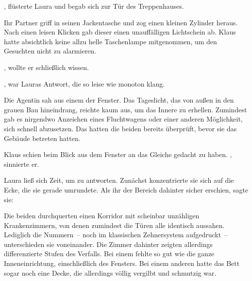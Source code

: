 \par

, flüsterte Laura und begab sich zur Tür des Treppenhauses.

\par

Ihr Partner griff in seinen Jackentasche und zog einen kleinen Zylinder heraus. Nach einen leisen Klicken gab dieser einen unauffälligen Lichtschein ab. Klaus hatte absichtlich keine allzu helle Taschenlampe mitgenommen, um den Gesuchten nicht zu alarmieren.

\par

, wollte er schließlich wissen.

\par

, war Lauras Antwort, die so leise wie monoton klang. 

\par

Die Agentin sah aus einem der Fenster. Das Tageslicht, das von außen in den grauen Bau hineindrang, reichte kaum aus, um das Innere zu erhellen. Zumindest gab es nirgendwo Anzeichen eines Fluchtwagens oder einer anderen Möglichkeit, sich schnell abzusetzen. Das hatten die beiden bereits überprüft, bevor sie das Gebäude betreten hatten.

\par

Klaus schien beim Blick aus dem Fenster an das Gleiche gedacht zu haben. , sinnierte er. 

\par

Laura ließ sich Zeit, um zu antworten. Zunächst konzentrierte sie sich auf die Ecke, die sie gerade umrundete. Als ihr der Bereich dahinter sicher erschien, sagte sie: 

\par

Die beiden durchquerten einen Korridor mit scheinbar unzähligen Krankenzimmern, von denen zumindest die Türen alle identisch aussahen. Lediglich die Nummern~-- noch im klassischen Zehnersystem aufgedruckt~-- unterschieden sie voneinander. Die Zimmer dahinter zeigten allerdings differenzierte Stufen des Verfalls. Bei einem fehlte so gut wie die ganze Inneneinrichtung, einschließlich des Fensters. Bei einem anderen hatte das Bett sogar noch eine Decke, die allerdings völlig vergilbt und schmutzig war.

